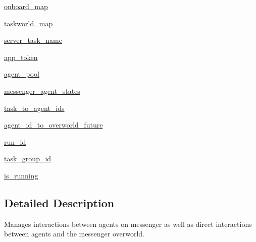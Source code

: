 \begin{DoxyCompactItemize}
\item 
\hyperlink{classparlai_1_1chat__service_1_1services_1_1messenger_1_1messenger__manager_1_1MessengerManager_a8bacca1a1993c53c37c463b18d7032d1}{onboard\+\_\+map}
\item 
\hyperlink{classparlai_1_1chat__service_1_1services_1_1messenger_1_1messenger__manager_1_1MessengerManager_acfc4cbe88bedd5145fe9a77b7776c4b7}{taskworld\+\_\+map}
\item 
\hyperlink{classparlai_1_1chat__service_1_1services_1_1messenger_1_1messenger__manager_1_1MessengerManager_a7cef66a59364fa94ea8ff77a311ecf63}{server\+\_\+task\+\_\+name}
\item 
\hyperlink{classparlai_1_1chat__service_1_1services_1_1messenger_1_1messenger__manager_1_1MessengerManager_aa52ef2280a697896f4d3b5bdb322e553}{app\+\_\+token}
\item 
\hyperlink{classparlai_1_1chat__service_1_1services_1_1messenger_1_1messenger__manager_1_1MessengerManager_aa8ec05fd465ab10f6516922b9e4e27ca}{agent\+\_\+pool}
\item 
\hyperlink{classparlai_1_1chat__service_1_1services_1_1messenger_1_1messenger__manager_1_1MessengerManager_a5a127452d2add303704b15423555429e}{messenger\+\_\+agent\+\_\+states}
\item 
\hyperlink{classparlai_1_1chat__service_1_1services_1_1messenger_1_1messenger__manager_1_1MessengerManager_a579c9ed84b852c9e2f509159c788c987}{task\+\_\+to\+\_\+agent\+\_\+ids}
\item 
\hyperlink{classparlai_1_1chat__service_1_1services_1_1messenger_1_1messenger__manager_1_1MessengerManager_acc1e01176d2920dff40fe17e3f7b6145}{agent\+\_\+id\+\_\+to\+\_\+overworld\+\_\+future}
\item 
\hyperlink{classparlai_1_1chat__service_1_1services_1_1messenger_1_1messenger__manager_1_1MessengerManager_a8a8a8bd2d11c4d2a04a55d8e36a33b19}{run\+\_\+id}
\item 
\hyperlink{classparlai_1_1chat__service_1_1services_1_1messenger_1_1messenger__manager_1_1MessengerManager_aa1b851c97deec7a81aaa3c0edb3967c0}{task\+\_\+group\+\_\+id}
\item 
\hyperlink{classparlai_1_1chat__service_1_1services_1_1messenger_1_1messenger__manager_1_1MessengerManager_ab0cc43f26c55b5fd8c6b05897f00af4f}{is\+\_\+running}
\end{DoxyCompactItemize}


\subsection{Detailed Description}
\begin{DoxyVerb}Manages interactions between agents on messenger as well as direct interactions
between agents and the messenger overworld.
\end{DoxyVerb}
 

